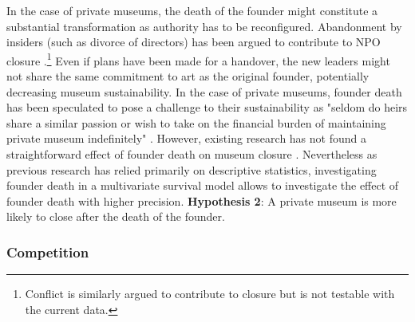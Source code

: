 \documentclass[12pt]{article}
\begin{document}
In the case of private museums, the death of the founder might constitute a substantial transformation as authority has to be reconfigured.
Abandonment by insiders (such as divorce of directors) has been argued to contribute to NPO closure \parencite{Duckles_Hager_Galaskiewicz_2005_close}.\footnote{Conflict is similarly argued to contribute to closure but is not testable with the current data.}
Even if plans have been made for a handover, the new leaders might not share the same commitment to art as the original founder, potentially decreasing museum sustainability. 
In the case of private museums, founder death has been speculated to pose a challenge to their sustainability as "seldom do heirs share a similar passion or wish to take on the financial burden of maintaining private museum indefinitely" \parencite[p.234]{Walker_2019_collector}.
However, existing research has not found a straightforward effect of founder death on museum closure \parencite{Velthuis_Gera_forthcoming_fragility,Velthuis_etal_2023_boom}.
Nevertheless as previous research has relied primarily on descriptive statistics, investigating founder death in a multivariate survival model allows to investigate the effect of founder death with higher precision.
\bigbreak
\noindent
\textbf{Hypothesis 2}: A private museum is more likely to close after the death of the founder.



\subsubsection*{Competition}
\end{document}
